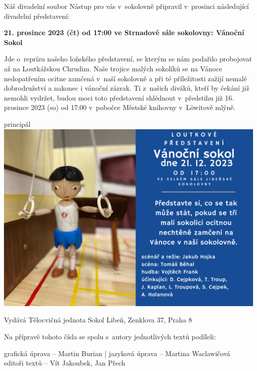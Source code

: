 \documentclass[11pt]{article}
\begin{document}
\signature{Anka Holanová}{}

Náš divadelní soubor Nástup pro vás v~sokolovně připravil v~prosinci následující divadelní představení:

\textbf{21. prosince 2023 (čt) od 17:00 ve Strnadově sále sokolovny: Vánoční Sokol}

Jde o~reprízu našeho loňského představení, se kterým se nám podařilo probojovat až na Loutkářskou Chrudim. Naše trojice malých sokolíků se na Vánoce nedopatřením ocitne zamčená v~naší sokolovně a při té příležitosti zažijí nemalé dobrodružství a nakonec i vánoční zázrak. Ti z~našich diváků, kteří by čekání již nemohli vydržet, budou moci toto představení shlédnout v~předstihu již 16. prosince 2023 (so) od 17:00 v~pobočce Městské knihovny v~Löwitově mlýně.  

\signature{Tomáš Troup}{principál}
\vspace*{12pt}
\noindent
\includegraphics*[width=\linewidth]{Vanocni_Sokol_sal_21_12_2023.png}

\clearpage




\clearpage
\pagestyle{blank}

\vspace*{96pt}

\pagecolor{sokolred}
\color{white}


\vspace*{\fill}

\begin{center}
Vydává Tělocvičná jednota Sokol Libeň, Zenklova 37, Praha 8

\vspace*{12pt}

Na přípravě tohoto čísla se spolu s~autory jednotlivých textů podíleli:

grafická úprava – Martin Burian | jazyková úprava – Martina Waclawičová \\ editoři textů – Vít Jakoubek, Jan Přech
\end{center}
\end{document}
